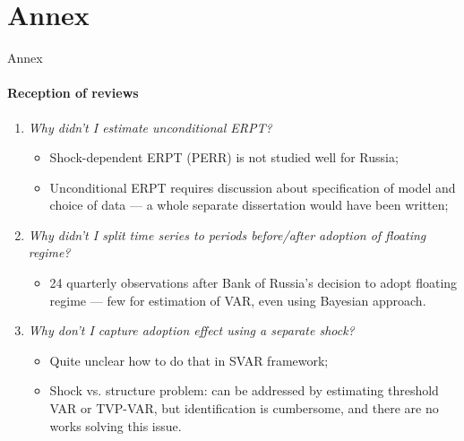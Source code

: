 \documentclass{beamer}
\begin{document}
\section{Annex}
\begin{frame}[noframenumbering]{Annex}
	\framesubtitle{Reception of reviews}
	\label{reception}
	\begin{enumerate}
		\item \textit{Why didn't I estimate unconditional ERPT?}
		\begin{itemize}
			\item Shock-dependent ERPT (PERR) is not studied well for Russia;
			\item Unconditional ERPT requires discussion about specification of model and choice of data --- a whole separate dissertation would have been written;
		\end{itemize}
		\item \textit{Why didn't I split time series to periods before/after adoption of floating regime?}
		\begin{itemize}
			\item 24 quarterly observations after Bank of Russia's decision to adopt floating regime --- few for estimation of VAR, even using Bayesian approach.
		\end{itemize}
		\item \textit{Why don't I capture adoption effect using a separate shock?}
		\begin{itemize}
			\item Quite unclear how to do that in SVAR framework;
			\item Shock vs. structure problem: can be addressed by estimating threshold VAR or TVP-VAR, but identification is cumbersome, and there are no works solving this issue.
		\end{itemize}
	\end{enumerate}
	  
\end{frame}
\end{document}
